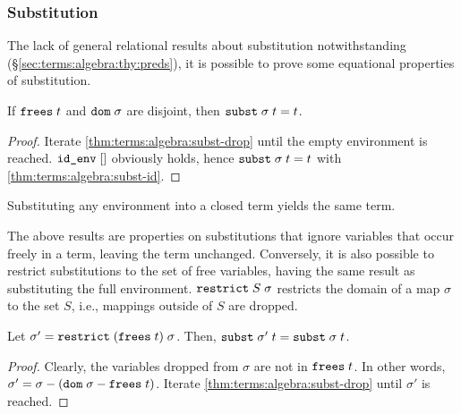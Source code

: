 \subsubsection{Substitution}
\label{sec:terms:algebra:thy:subst}

The lack of general relational results about substitution notwithstanding (§\ref{sec:terms:algebra:thy:preds}), it is possible to prove some equational properties of substitution.

\begin{corollary}\label{thm:terms:algebra:disjoint}
  If $\texttt{\textup{frees}}\;t$ and $\texttt{\textup{dom}}\;\sigma$ are disjoint, then $\texttt{\textup{subst}}\;\sigma\;t = t$.
\end{corollary}

\begin{proof}
  Iterate \cref{thm:terms:algebra:subst-drop} until the empty environment is reached.
  $\texttt{\textup{id\_env}}\;[]$ obviously holds, hence $\texttt{\textup{subst}}\;\sigma\;t = t$ with \cref{thm:terms:algebra:subst-id}.
\end{proof}

\begin{corollary}\label{thm:terms:algebra:subst-closed}
  Substituting any environment into a closed term yields the same term.
\end{corollary}

\noindent
The above results are properties on substitutions that ignore variables that occur freely in a term, leaving the term unchanged.
Conversely, it is also possible to restrict substitutions to the set of free variables, having the same result as substituting the full environment.
$\texttt{\textup{restrict}}\;S\;\sigma$ restricts the domain of a map $\sigma$ to the set $S$, i.e., mappings outside of $S$ are dropped.

\begin{lemma}\label{thm:terms:algebra:subst-restrict}
  Let $\sigma' = \texttt{\textup{restrict}}\;(\texttt{\textup{frees}}\;t)\;\sigma$.
  Then, $\texttt{\textup{subst}}\;\sigma'\;t = \texttt{\textup{subst}}\;\sigma\;t$.
\end{lemma}

\begin{proof}
  Clearly, the variables dropped from $\sigma$ are not in $\texttt{\textup{frees}}\;t$.
  In other words, $\sigma' = \sigma - (\texttt{\textup{dom}}\;\sigma - \texttt{\textup{frees}}\;t)$.
  Iterate \cref{thm:terms:algebra:subst-drop} until $\sigma'$ is reached.
\end{proof}

